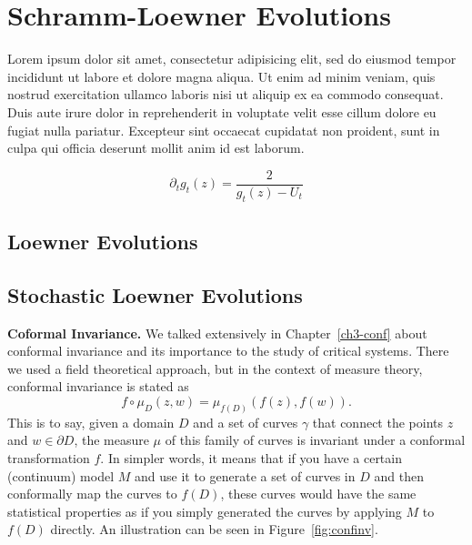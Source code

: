 \chapter{Schramm-Loewner Evolutions}
\label{ch4-sle}

Lorem ipsum dolor sit amet, consectetur adipisicing elit, sed do eiusmod tempor
incididunt ut labore et dolore magna aliqua. Ut enim ad minim veniam, quis
nostrud exercitation ullamco laboris nisi ut aliquip ex ea commodo consequat.
Duis aute irure dolor in reprehenderit in voluptate velit esse cillum dolore eu
fugiat nulla pariatur. Excepteur sint occaecat cupidatat non proident, sunt in
culpa qui officia deserunt mollit anim id est laborum.

\begin{equation}
    \partial_t g_t(z) = \frac{2}{g_t(z) - U_t}
    \label{eq:loew}
\end{equation}

\section{Loewner Evolutions}
\label{sec:le}

\section{Stochastic Loewner Evolutions}
\label{sec:le}

\textbf{Coformal Invariance.}
We talked extensively in Chapter~\ref{ch3-conf} about conformal invariance and
its importance to the study of critical systems. There we used a field
theoretical approach, but in the context of measure theory, conformal
invariance is stated as
\begin{equation}
    \newcommand{\pp}[1]{\left(#1\right)}
    f\circ\mu_D\pp{z,w} = \mu_{f(D)}\pp{f\pp{z}, f\pp{w}}.
\end{equation}
This is to say, given a domain $D$ and a set of curves $\gamma$ that connect
the points $z$ and $w\in\partial D$, the measure $\mu$ of this family of curves
is invariant under a conformal transformation $f$. In simpler words, it means
that if you have a certain (continuum) model $M$ and use it to generate a set
of curves in $D$ and then conformally map the curves to $f(D)$, these
curves would have the same statistical properties as if you simply generated the
curves by applying $M$ to $f(D)$ directly. An illustration can be seen in
Figure~\ref{fig:confinv}.


